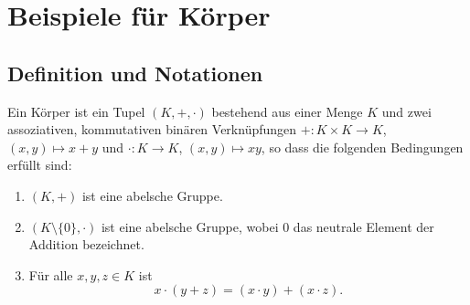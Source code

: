 \section{Beispiele für Körper}





\subsection{Definition und Notationen}


\begin{defi}
 Ein Körper ist ein Tupel $(K, +, \cdot)$ bestehend aus einer Menge $K$ und zwei assoziativen, kommutativen binären Verknüpfungen $+ \colon K \times K \to K$, $(x,y) \mapsto x + y$ und $\cdot \colon K \to K$, $(x,y) \mapsto xy$, so dass die folgenden Bedingungen erfüllt sind:
 \begin{enumerate}[label=\roman*)]
  \item
   $(K,+)$ ist eine abelsche Gruppe.
  \item
   $(K \setminus \{0\},\cdot)$ ist eine abelsche Gruppe, wobei $0$ das neutrale Element der Addition bezeichnet.
  \item
   Für alle $x,y,z \in K$ ist
   \[
    x \cdot (y+z) = (x \cdot y) + (x \cdot z).
   \]
 \end{enumerate}
\end{defi}


